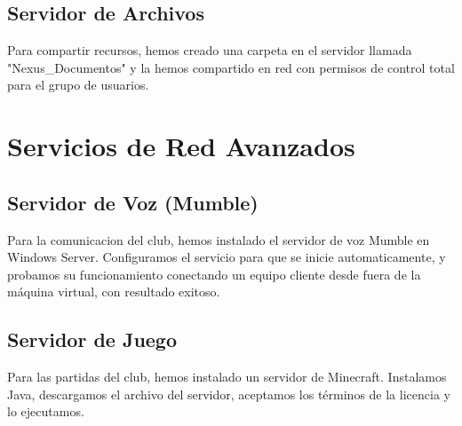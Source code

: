 \documentclass{article}
\begin{document}
\subsection{Servidor de Archivos}
Para compartir recursos, hemos creado una carpeta en el servidor llamada "Nexus\_Documentos" y la hemos compartido en red con permisos de control total para el grupo de usuarios.

\section{Servicios de Red Avanzados}

\subsection{Servidor de Voz (Mumble)}
Para la comunicacion del club, hemos instalado el servidor de voz Mumble en Windows Server. Configuramos el servicio para que se inicie automaticamente, y probamos su funcionamiento conectando un equipo cliente desde fuera de la máquina virtual, con resultado exitoso.

\subsection{Servidor de Juego}
Para las partidas del club, hemos instalado un servidor de Minecraft. Instalamos Java, descargamos el archivo del servidor, aceptamos los términos de la licencia y lo ejecutamos.
\end{document}
